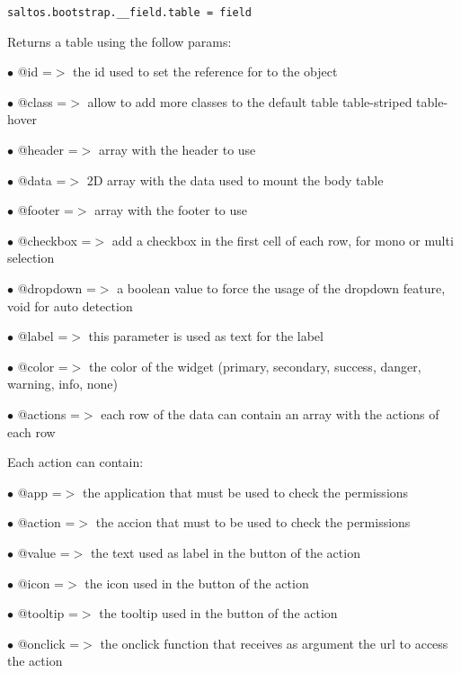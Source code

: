 \documentclass[a4paper]{book}
\begin{document}
\begin{lstlisting}
saltos.bootstrap.__field.table = field
\end{lstlisting}

Returns a table using the follow params:

\begin{compactitem}
\item[\color{myblue}$\bullet$] @id       =$>$ the id used to set the reference for to the object
\item[\color{myblue}$\bullet$] @class    =$>$ allow to add more classes to the default table table-striped table-hover
\item[\color{myblue}$\bullet$] @header   =$>$ array with the header to use
\item[\color{myblue}$\bullet$] @data     =$>$ 2D array with the data used to mount the body table
\item[\color{myblue}$\bullet$] @footer   =$>$ array with the footer to use
\item[\color{myblue}$\bullet$] @checkbox =$>$ add a checkbox in the first cell of each row, for mono or multi selection
\item[\color{myblue}$\bullet$] @dropdown =$>$ a boolean value to force the usage of the dropdown feature, void for auto detection
\item[\color{myblue}$\bullet$] @label    =$>$ this parameter is used as text for the label
\item[\color{myblue}$\bullet$] @color    =$>$ the color of the widget (primary, secondary, success, danger, warning, info, none)
\item[\color{myblue}$\bullet$] @actions  =$>$ each row of the data can contain an array with the actions of each row
\end{compactitem}

Each action can contain:

\begin{compactitem}
\item[\color{myblue}$\bullet$] @app     =$>$ the application that must be used to check the permissions
\item[\color{myblue}$\bullet$] @action  =$>$ the accion that must to be used to check the permissions
\item[\color{myblue}$\bullet$] @value   =$>$ the text used as label in the button of the action
\item[\color{myblue}$\bullet$] @icon    =$>$ the icon used in the button of the action
\item[\color{myblue}$\bullet$] @tooltip =$>$ the tooltip used in the button of the action
\item[\color{myblue}$\bullet$] @onclick =$>$ the onclick function that receives as argument the url to access the action
\end{compactitem}
\end{document}
